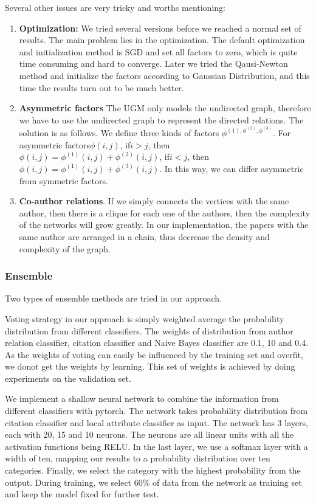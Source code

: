 \documentclass{sig-alternate}
\begin{document}
Several other issues are very tricky and worths mentioning:
\begin{enumerate}
    \item \textbf{Optimization:} We tried several versions before we reached a normal set of results. The main problem lies in the optimization. The default optimization and initialization method is SGD and set all factors to zero, which is quite time consuming and hard to converge. Later we tried the Qausi-Newton method and initialize the factors according to Gaussian Distribution, and this time the results turn out to be much better.
    \item \textbf{Asymmetric factors} The UGM only models the undirected graph, therefore we have to use the undirected graph to represent the directed relations. The solution is as follows. We define three kinds of factors $\phi^{(1),\phi^{(2)},\phi^{(3)}}$. For asymmetric factors$\phi(i,j)$, if$i>j$, then $\phi(i,j)=\phi^{(1)}(i,j)+\phi^{(2)}(i,j)$, if$i<j$, then $\phi(i,j)=\phi^{(1)}(i,j)+\phi^{(3)}(i,j)$. In this way, we can differ asymmetric from symmetric factors.
    \item \textbf{Co-author relations}. If we simply connects the vertices with the same author, then there is a clique for each one of the authors, then the complexity of the networks will grow greatly. In our implementation, the papers with the same author are arranged in a chain, thus decrease the density and complexity of the graph.
\end{enumerate}

\subsubsection{Ensemble}
Two types of ensemble methods are tried in our approach. 

Voting strategy in our approach is simply weighted average the probability distribution from different classifiers. The weights of distribution from author relation classifier, citation classifier and Naive Bayes classifier are 0.1, 10 and 0.4. As the weights of voting can easily be influenced by the training set and overfit, we donot get the weights by learning. This set of weights is achieved by doing experiments on the validation set.

We implement a shallow neural network to combine the information from different classifiers with pytorch\cite{paszke2017automatic}. The network takes probability distribution from citation classifier and local attribute classifier  as input. The network has 3 layers, each with 20, 15 and 10 neurons. The neurons are all linear units with all the activation functions being RELU. In the last layer, we use a softmax layer with a width of ten, mapping our results to a probability distribution over ten categories. Finally, we select the category with the highest probability from the output. During training, we select 60\% of data from the network as training set and keep the model fixed for further test.
\end{document}
